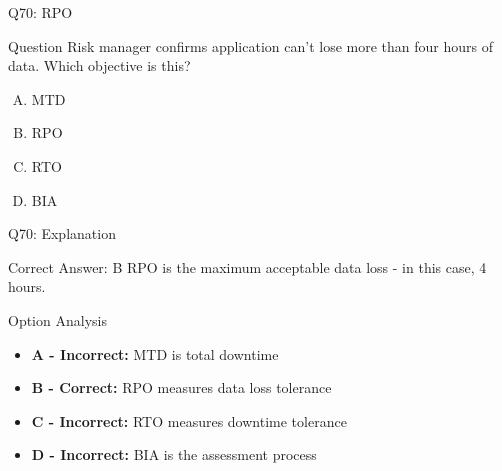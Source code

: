 \documentclass{beamer}
\begin{document}
	\begin{frame}{Q70: RPO}
		\begin{block}{Question}
			Risk manager confirms application can't lose more than four hours of data. Which objective is this?
		\end{block}
		\begin{enumerate}[(A)]
			\item MTD
			\item RPO
			\item RTO
			\item BIA
		\end{enumerate}
	\end{frame}
	
	\begin{frame}{Q70: Explanation}
		\begin{block}{Correct Answer: B}
			RPO is the maximum acceptable data loss - in this case, 4 hours.
		\end{block}
		\begin{block}{Option Analysis}
			\begin{itemize}
				\item \textbf{A - Incorrect:} MTD is total downtime
				\item \textbf{B - Correct:} RPO measures data loss tolerance
				\item \textbf{C - Incorrect:} RTO measures downtime tolerance
				\item \textbf{D - Incorrect:} BIA is the assessment process
			\end{itemize}
		\end{block}
	\end{frame}
	
\end{document}
